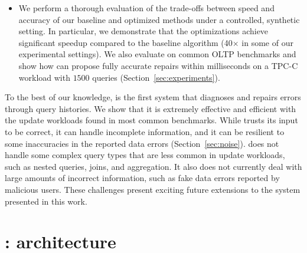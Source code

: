 \begin{itemize}[leftmargin=*, topsep=0mm, itemsep=0mm]
    \item We perform a thorough evaluation of the trade-offs between speed and accuracy of our baseline and optimized methods under a controlled, synthetic setting. In particular, we demonstrate that the  \sys optimizations achieve significant speedup compared to the baseline algorithm (40$\times$ in some of our experimental settings).
    We also evaluate \sys on common OLTP benchmarks and show how \sys can propose fully accurate repairs within milliseconds on a TPC-C workload with $1500$ queries (Section~\ref{sec:experiments}).
\end{itemize}

To the best of our knowledge, \sys is the first system that diagnoses
and repairs errors through query histories. We show that it is
extremely effective and efficient with the update workloads found in
most common benchmarks. 
While \sys trusts its input to be correct, it
can handle incomplete information, and it can be resilient to some
inaccuracies in the reported data errors (Section~\ref{sec:noise}).
\sys does not handle some complex query types
that are less common in update workloads, such as nested queries,
joins, and aggregation. 
It also does not currently deal with large amounts of incorrect
information, such as fake data errors reported by malicious users.
These challenges present exciting future extensions to the system presented in this work.






\section{{\large\textbf{\sys}}: architecture}



